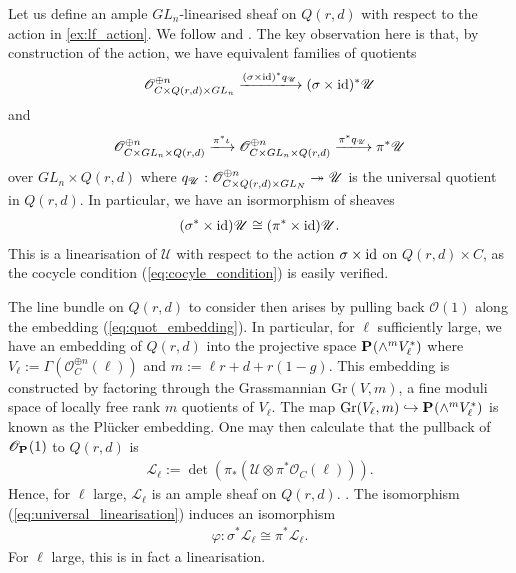 \documentclass[12pt]{ociamthesis}  %
\begin{document}
\begin{example}
  Let us define an ample $GL_n$-linearised sheaf on
  $Q(r,d)$ with respect to the action in \ref{ex:lf_action}. We follow
  \cite[75-76]{hoskins2016} and \cite[90]{huybrechts2010}.
  The key observation
  here is that, by construction of the action, we have equivalent
  families of quotients
  \begin{align*}
    \mathscr O^{\oplus n}_{C\times Q(r,d)\times GL_n}
    \xlongrightarrow{(\sigma\times\identity)^* q_{\mathscr U}}
    (\sigma\times\identity)^* \mathscr U
  \end{align*}
  and
  \begin{align*}
    \mathscr O^{\oplus n}_{C\times GL_n\times Q(r,d)}
    \xlongrightarrow{\pi^*\iota}
    \mathscr O^{\oplus n}_{C\times GL_n\times Q(r,d)}
    \xlongrightarrow{\pi^*q_{\mathscr U}}
    \pi^*\mathscr U
  \end{align*}
  over $GL_n\times Q(r,d)$ where
  $q_{\mathscr U} : \mathscr O^{\oplus n}_{C\times Q(r,d)\times GL_N} \twoheadrightarrow \mathscr U$
  is the universal quotient in $Q(r,d)$. In particular, we have
  an isormorphism of sheaves
  \begin{align}\label{eq:universal_linearisation}
    (\sigma^*\times\operatorname{id})\mathscr U \cong (\pi^*\times\operatorname{id})\mathscr U.
  \end{align}
  This is a linearisation of $\mathscr U$ with respect to
  the action $\sigma\times\operatorname{id}$ on $Q(r,d)\times C$, as the
  cocycle condition (\ref{eq:cocyle_condition}) is easily verified.

  The line bundle on $Q(r,d)$ to consider then arises
  by pulling back $\mathscr O(1)$ along the embedding (\ref{eq:quot_embedding}).
  In particular, for $\ell$ sufficiently large, we have an
  embedding of $Q(r,d)$ into the projective space
  $\mathbf{P}^{}_{}(\wedge^m V_\ell^*)$
  where $V_\ell:=\Gamma(\mathscr O^{\oplus n}_C(\ell))$ and $m := \ell r+d+r(1-g)$.
  This embedding is constructed by factoring through the Grassmannian
  $\text{Gr}(V,m)$, a fine moduli space of locally free rank $m$ quotients of
  $V_\ell$.  The map $\text{Gr}(V_\ell,m)\hookrightarrow\mathbf{P}^{}_{}(\wedge^m V_\ell^*)$ is known as the Pl\"ucker
  embedding.  One may then calculate that the pullback of $\mathscr
    O_{\mathbf{P}^{}_{}}(1)$ to $Q(r,d)$ is
  \begin{align*}
    \mathscr L_\ell
    := \det(\pi_*(\mathscr U \otimes \pi^*\mathscr O_C(\ell))).
  \end{align*}
  Hence, for $\ell$ large, $\mathscr L_\ell$ is an ample sheaf
  on $Q(r,d)$. \cite[Proposition 2.2.5]{huybrechts2010}.
  The isomorphism (\ref{eq:universal_linearisation}) induces an isomorphism
  \begin{align*}
    \varphi:\sigma^*\mathscr L_\ell \cong \pi^*\mathscr L_\ell.
  \end{align*}
  For $\ell$ large, this is in fact a linearisation.
\end{example}
\end{document}
